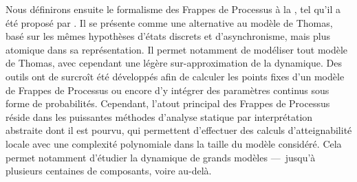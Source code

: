 Nous définirons ensuite le formalisme des Frappes de Processus
à la , tel qu'il a été proposé par .
Il se présente comme une alternative au modèle de Thomas,
basé sur les mêmes hypothèses d'états discrets et d'asynchronisme,
mais plus atomique dans sa représentation.
Il permet notamment de modéliser tout modèle de Thomas,
avec cependant une légère sur-approximation de la dynamique.
Des outils ont de surcroît été développés afin de calculer les points fixes d'un modèle de
Frappes de Processus ou encore d'y intégrer des paramètres continus
sous forme de probabilités.
Cependant, l'atout principal des Frappes de Processus réside dans les puissantes
méthodes d'analyse statique par interprétation abstraite dont il est pourvu,
qui permettent d'effectuer des calculs d'atteignabilité locale
avec une complexité polynomiale dans la taille du modèle considéré.
Cela permet notamment d'étudier la dynamique de grands modèles
---~jusqu'à plusieurs centaines de composants, voire au-delà.






